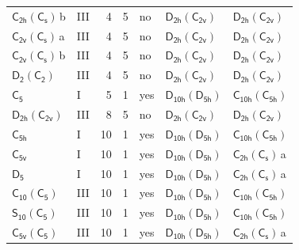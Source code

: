 \documentclass[10pt,a4paper]{article}
\numberwithin{equation}{section}
\newcommand{\grp}[1]{\mathsf{#1}}
\newcommand{\clsletter}[1]{\,{\scriptsize\color{black!55}#1}}
\begin{document}
{\begin{longtable}{@{}llrrlll@{}}
\href{C2h-C1v.pdf}{$\grp{C_{2h}}(\grp{C_{s}})$}\clsletter{b} & III & 4 & 5 & no & \href{D2h-C2v.pdf}{$\grp{D_{2h}}(\grp{C_{2v}})$} & \href{D2h-C2v.pdf}{$\grp{D_{2h}}(\grp{C_{2v}})$}\\
\href{C2v-C1v.pdf}{$\grp{C_{2v}}(\grp{C_{s}})$}\clsletter{a} & III & 4 & 5 & no & \href{D2h-C2v.pdf}{$\grp{D_{2h}}(\grp{C_{2v}})$} & \href{D2h-C2v.pdf}{$\grp{D_{2h}}(\grp{C_{2v}})$}\\
\href{C2v-C1v.pdf}{$\grp{C_{2v}}(\grp{C_{s}})$}\clsletter{b} & III & 4 & 5 & no & \href{D2h-C2v.pdf}{$\grp{D_{2h}}(\grp{C_{2v}})$} & \href{D2h-C2v.pdf}{$\grp{D_{2h}}(\grp{C_{2v}})$}\\
\href{D2-C2.pdf}{$\grp{D_{2}}(\grp{C_{2}})$} & III & 4 & 5 & no & \href{D2h-C2v.pdf}{$\grp{D_{2h}}(\grp{C_{2v}})$} & \href{D2h-C2v.pdf}{$\grp{D_{2h}}(\grp{C_{2v}})$}\\
\href{../../../rotation/data/pdf/C5.pdf}{$\grp{C_{5}}$} & I & 5 & 1 & yes & \href{D10h-D5h.pdf}{$\grp{D_{10h}}(\grp{D_{5h}})$} & \href{C10h-C5h.pdf}{$\grp{C_{10h}}(\grp{C_{5h}})$}\\
\href{D2h-C2v.pdf}{$\grp{D_{2h}}(\grp{C_{2v}})$} & III & 8 & 5 & no & \href{D2h-C2v.pdf}{$\grp{D_{2h}}(\grp{C_{2v}})$} & \href{D2h-C2v.pdf}{$\grp{D_{2h}}(\grp{C_{2v}})$}\\
\href{../../../rotation/data/pdf/C5h.pdf}{$\grp{C_{5h}}$} & I & 10 & 1 & yes & \href{D10h-D5h.pdf}{$\grp{D_{10h}}(\grp{D_{5h}})$} & \href{C10h-C5h.pdf}{$\grp{C_{10h}}(\grp{C_{5h}})$}\\
\href{../../../rotation/data/pdf/C5v.pdf}{$\grp{C_{5v}}$} & I & 10 & 1 & yes & \href{D10h-D5h.pdf}{$\grp{D_{10h}}(\grp{D_{5h}})$} & \href{C2h-C1v.pdf}{$\grp{C_{2h}}(\grp{C_{s}})$}\clsletter{a}\\
\href{../../../rotation/data/pdf/D5.pdf}{$\grp{D_{5}}$} & I & 10 & 1 & yes & \href{D10h-D5h.pdf}{$\grp{D_{10h}}(\grp{D_{5h}})$} & \href{C2h-C1v.pdf}{$\grp{C_{2h}}(\grp{C_{s}})$}\clsletter{a}\\
\href{C10-C5.pdf}{$\grp{C_{10}}(\grp{C_{5}})$} & III & 10 & 1 & yes & \href{D10h-D5h.pdf}{$\grp{D_{10h}}(\grp{D_{5h}})$} & \href{C10h-C5h.pdf}{$\grp{C_{10h}}(\grp{C_{5h}})$}\\
\href{S10-C5.pdf}{$\grp{S_{10}}(\grp{C_{5}})$} & III & 10 & 1 & yes & \href{D10h-D5h.pdf}{$\grp{D_{10h}}(\grp{D_{5h}})$} & \href{C10h-C5h.pdf}{$\grp{C_{10h}}(\grp{C_{5h}})$}\\
\href{C5v-C5.pdf}{$\grp{C_{5v}}(\grp{C_{5}})$} & III & 10 & 1 & yes & \href{D10h-D5h.pdf}{$\grp{D_{10h}}(\grp{D_{5h}})$} & \href{C2h-C1v.pdf}{$\grp{C_{2h}}(\grp{C_{s}})$}\clsletter{a}\\

\end{longtable}}
\end{document}
